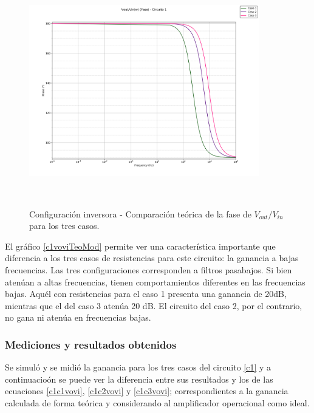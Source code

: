 \begin{figure}[H] %
	\centering
	\includegraphics[width=10cm,height=10cm,keepaspectratio]{../EJ1/00GRAFICOS/teoricos/circ1vovifasew.png}
	\caption{Configuración inversora - Comparaci\'on te\'orica de la fase de $V_{out}/V_{in}$ para los tres casos.}
	\label{c1voviTeoPh}
\end{figure}

El gr\'afico \ref{c1voviTeoMod} permite ver una caracter\'istica importante que diferencia a los tres casos de resistencias para este circuito: la ganancia a bajas frecuencias. Las tres configuraciones corresponden a filtros pasabajos. Si bien aten\'uan a altas frecuencias, tienen comportamientos diferentes en las frecuencias bajas. Aqu\'el con resistencias para el caso 1 presenta una ganancia de 20dB, mientras que el del caso 3 aten\'ua 20 dB. El circuito del caso 2, por el contrario, no gana ni aten\'ua en frecuencias bajas.


\subsubsection*{Mediciones y resultados obtenidos} %

Se simul\'o y se midi\'o la ganancia para los tres casos del circuito \ref{c1} y a continuacio\'on se puede ver la diferencia entre sus resultados y los de las ecuaciones \ref{c1c1vovi}, \ref{c1c2vovi} y \ref{c1c3vovi}; correspondientes a la ganancia calculada de forma te\'orica y considerando al amplificador operacional como ideal.

